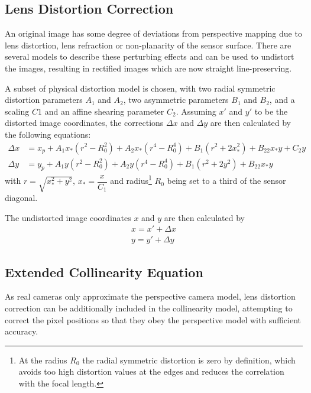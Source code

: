 \subsection{Lens Distortion Correction}
\label{subsec:LensDistortion}

An original image has some degree of deviations from perspective mapping due to lens distortion, lens refraction or non-planarity of the sensor surface. There are several models to describe these perturbing effects and can be used to undistort the images, resulting in rectified images which are now straight line-preserving.
 
A subset of physical distortion model \cite{Fraser1997} is chosen, with two radial symmetric distortion parameters $A_1$ and $A_2$, two asymmetric parameters $B_1$ and $B_2$, and a scaling $C1$ and an affine shearing parameter $C_2$. Assuming $x\prime$ and $y\prime$ to be the distorted image coordinates, the corrections $\Delta x$ and $\Delta y$ are then calculated by the following equations:
\begin{equation} \label{eq:LensDistortion}
\begin{split}
\Delta x &= x_p + A_1x_*(r^2-R_0^2) + A_2x_*(r^4-R_0^4) + B_1(r^2+2x_*^2) + B_22x_*y+C_2y \\
\Delta y &= y_p + A_1y  (r^2-R_0^2) + A_2y  (r^4-R_0^4) + B_1(r^2+2y^2)   + B_22x_*y
\end{split}
\end{equation}
with $r=\sqrt{x_*^2+y^2}$, $x_*=\dfrac{x}{C_1}$ and radius\footnote{At the radius $R_0$ the radial symmetric distortion is zero by definition, which avoids too high distortion values at the edges and reduces the correlation with the focal length.} $R_0$ being set %
to a third of the sensor diagonal.

The undistorted image coordinates $x$ and $y$ are then calculated by
\begin{equation} \label{eq:undistortedimgcoord}
\begin{split}
x=x\prime+\Delta x \\
y=y\prime+\Delta y
\end{split}
\end{equation}

\subsection{Extended Collinearity Equation}
\label{subsec:ExtendedCollinearity}
As real cameras only approximate the perspective camera model, lens distortion correction can be additionally included in the collinearity model, attempting to correct the pixel positions so that they obey the perspective model with sufficient accuracy.%

